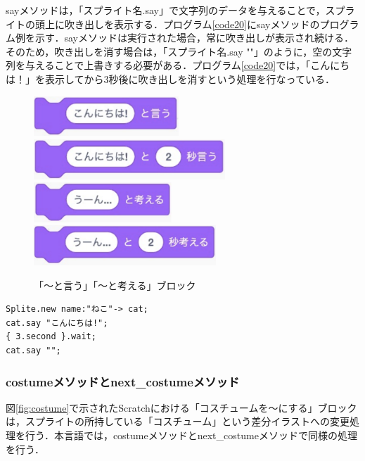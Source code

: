 \documentclass[10pt,a4j]{ltjsarticle}
\begin{document}
sayメソッドは，「スプライト名.say」で文字列のデータを与えることで，スプライトの頭上に吹き出しを表示する．プログラム\ref{code20}にsayメソッドのプログラム例を示す．sayメソッドは実行された場合，常に吹き出しが表示され続ける．そのため，吹き出しを消す場合は，「スプライト名.say ""」のように，空の文字列を与えることで上書きする必要がある．プログラム\ref{code20}では，「こんにちは！」を表示してから3秒後に吹き出しを消すという処理を行なっている．

\begin{figure}[H]
  \centering
  \includegraphics[height=15mm]{images/say.pdf} \\
  \includegraphics[height=15mm]{images/say_time.pdf} \\
  \includegraphics[height=15mm]{images/think.pdf} \\
  \includegraphics[height=15mm]{images/think_time.pdf} 
  \caption{「〜と言う」「〜と考える」ブロック}
  \label{fig:say}
\end{figure}

\begin{lstlisting}[caption=sayメソッドのプログラム例, label=code20]
Splite.new name:"ねこ"-> cat;
cat.say "こんにちは!";
{ 3.second }.wait;
cat.say "";
\end{lstlisting}

\subsubsection{costumeメソッドとnext\_costumeメソッド}
図\ref{fig:costume}で示されたScratchにおける「コスチュームを〜にする」ブロックは，スプライトの所持している「コスチューム」という差分イラストへの変更処理を行う．本言語では，costumeメソッドとnext\_costumeメソッドで同様の処理を行う．
\end{document}
